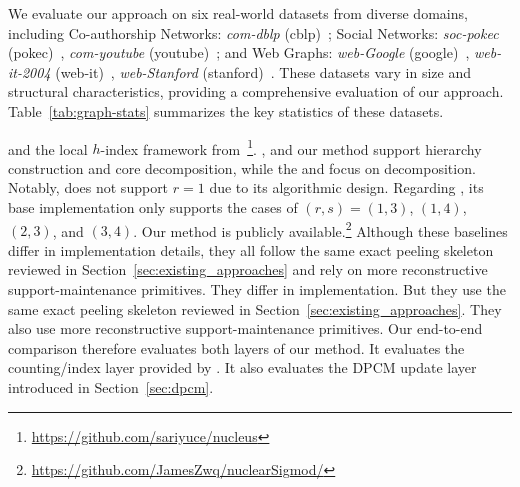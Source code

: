  We evaluate our approach on six real-world datasets from diverse domains, including Co-authorship Networks: \textit{com-dblp} (cblp)~\cite{dblp}; Social Networks: \textit{soc-pokec} (pokec)~\cite{soc-pokec}, \textit{com-youtube} (youtube)~\cite{dblp}; and Web Graphs: \textit{web-Google} (google)~\cite{Stanford}, \textit{web-it-2004} (web-it)~\cite{nr}, \textit{web-Stanford} (stanford)~\cite{Stanford}. These datasets vary in size and structural characteristics, providing a comprehensive evaluation of our approach. Table~\ref{tab:graph-stats} summarizes the key statistics of these datasets.

and the local $h$-index framework \nucleus from~\cite{LocalNuclear}\footnote{\url{https://github.com/sariyuce/nucleus}}.
\arb, \nucleus and our method support hierarchy construction and core decomposition, while the \nucleusOPT and \nucleusP focus on decomposition.
% 
Notably, \arb does not support $r=1$ due to its algorithmic design. 
% 
Regarding \nucleus, its base implementation only supports the cases of $(r,s)=(1,3)$, $(1,4)$, $(2,3)$, and $(3,4)$.
% 
Our method is publicly available.\footnote{\url{https://github.com/JamesZwq/nuclearSigmod/}}
%
Although these baselines differ in implementation details, they all follow the same exact peeling skeleton reviewed in Section~\ref{sec:existing_approaches} and rely on more reconstructive support-maintenance primitives.
%
They differ in implementation.
%
But they use the same exact peeling skeleton reviewed in Section~\ref{sec:existing_approaches}.
%
They also use more reconstructive support-maintenance primitives.
%
Our end-to-end comparison therefore evaluates both layers of our method.
%
It evaluates the counting/index layer provided by \cpi.
%
It also evaluates the DPCM update layer introduced in Section~\ref{sec:dpcm}.


